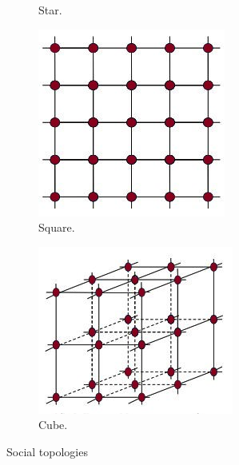 \begin{figure}[H]
\begin{subfigure}[b]{0.23\textwidth}
    \caption{Star.}
    \label{fig:startopology}
  \end{subfigure}
  \hfill
  \begin{subfigure}[b]{0.23\textwidth}
    \includegraphics[width=\textwidth]{"Part 2 - Search-Based Optimization/Particle Swarm Optimization/Images/SQUARE.jpg"}
    \caption{Square.}
    \label{fig:squaretopology}
  \end{subfigure}
  \hfill
  \begin{subfigure}[b]{0.23\textwidth}
    \includegraphics[width=\textwidth]{"Part 2 - Search-Based Optimization/Particle Swarm Optimization/Images/CUBE.jpg"}
    \caption{Cube.}
    \label{fig:cubetopology}
  \end{subfigure}
\caption{Social topologies}
  \label{fig:topologies}
\end{figure}


